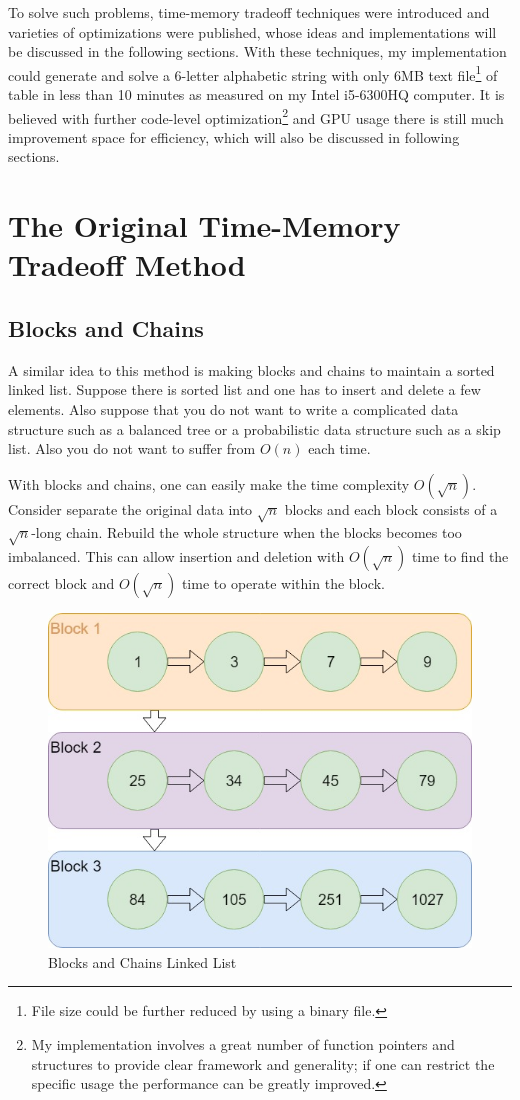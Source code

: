\documentclass{article}
\begin{document}
\begin{multicols}{2}
To solve such problems, time-memory tradeoff techniques were introduced and varieties of optimizations were published, whose ideas and implementations will be discussed in the following sections. With these techniques, my implementation could generate and solve a 6-letter alphabetic string with only 6MB text file\footnote{File size could be further reduced by using a binary file.} of table in less than 10 minutes as measured on my Intel i5-6300HQ computer. It is believed with further code-level optimization\footnote{My implementation involves a great number of function pointers and structures to provide clear framework and generality; if one can restrict the specific usage the performance can be greatly improved.} and GPU usage there is still much improvement space for efficiency, which will also be discussed in following sections.

\section{The Original Time-Memory Tradeoff Method}
\subsection{Blocks and Chains}
A similar idea to this method is making blocks and chains to maintain a sorted linked list. Suppose there is sorted list and one has to insert and delete a few elements. Also suppose that you do not want to write a complicated data structure such as a balanced tree or a probabilistic data structure such as a skip list. Also you do not want to suffer from $O(n)$ each time.

With blocks and chains, one can easily make the time complexity $O(\sqrt{n})$. Consider separate the original data into $\sqrt{n}$ blocks and each block consists of a $\sqrt{n}$-long chain. Rebuild the whole structure when the blocks becomes too imbalanced. This can allow insertion and deletion with $O(\sqrt{n})$ time to find the correct block and $O(\sqrt{n})$ time to operate within the block.
\begin{figure}[H]
	\centering
	\includegraphics[width=0.7\linewidth]{"img/block chains"}
	\caption{Blocks and Chains Linked List}
	\label{fig:block-chains}
\end{figure}

\end{multicols}
\end{document}
